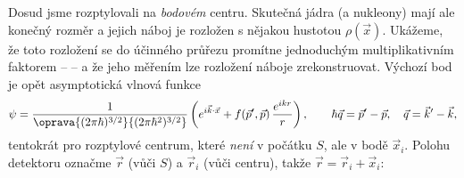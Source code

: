 Dosud jsme rozptylovali na \emph{bodovém} centru. Skutečná jádra (a nukleony) mají ale konečný rozměr a jejich náboj je rozložen s nějakou hustotou $\rho(\vec x)$. Ukážeme, že toto rozložení se do účinného průřezu promítne jednoduchým multiplikativním faktorem --  -- a že jeho měřením lze rozložení náboje zrekonstruovat. Výchozí bod je opět asymptotická vlnová funkce
\begin{equation}
  \psi = \frac{1}{\oprava{(2\pi\hbar)^{3/2}}{(2\pi\hbar^2)^{3/2}}}\left(e^{i\vec k\cdot\vec x} + f(\vec p',\vec p)\,\frac{e^{ikr}}{r}\right),
  \qquad
  \hbar\vec q = \vec p'-\vec p,\quad \vec q = \vec k'-\vec k ,
\end{equation}
tentokrát pro rozptylové centrum, které \emph{není} v počátku $S$, ale v bodě $\vec x_i$. Polohu detektoru označme $\vec r$ (vůči $S$) a $\vec r_i$ (vůči centru), takže $\vec r = \vec r_i + \vec x_i$:

\begin{center}
\end{center}

